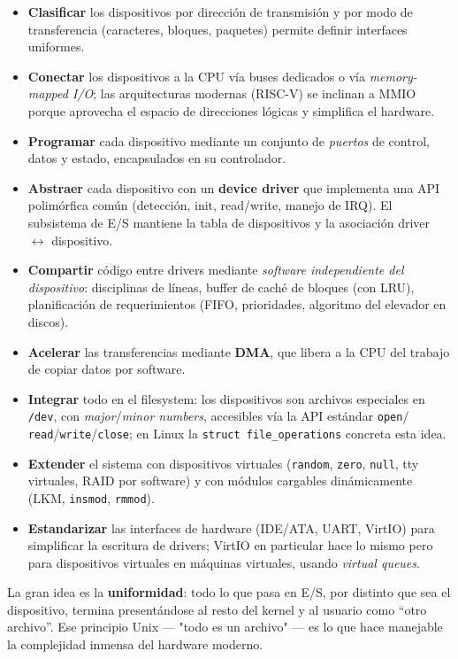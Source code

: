 \documentclass[11pt,a4paper]{article}
\begin{document}
\begin{itemize}[leftmargin=*]
    \item \textbf{Clasificar} los dispositivos por dirección de
        transmisión y por modo de transferencia (caracteres, bloques,
        paquetes) permite definir interfaces uniformes.
    \item \textbf{Conectar} los dispositivos a la CPU vía buses
        dedicados o vía \emph{memory-mapped I/O}; las arquitecturas
        modernas (RISC-V) se inclinan a MMIO porque aprovecha el
        espacio de direcciones lógicas y simplifica el hardware.
    \item \textbf{Programar} cada dispositivo mediante un conjunto de
        \emph{puertos} de control, datos y estado, encapsulados en su
        controlador.
    \item \textbf{Abstraer} cada dispositivo con un \textbf{device
        driver} que implementa una API polimórfica común (detección,
        init, read/write, manejo de IRQ). El subsistema de E/S
        mantiene la tabla de dispositivos y la asociación driver
        $\leftrightarrow$ dispositivo.
    \item \textbf{Compartir} código entre drivers mediante \emph{software
        independiente del dispositivo}: disciplinas de líneas, buffer
        de caché de bloques (con LRU), planificación de requerimientos
        (FIFO, prioridades, algoritmo del elevador en discos).
    \item \textbf{Acelerar} las transferencias mediante \textbf{DMA},
        que libera a la CPU del trabajo de copiar datos por software.
    \item \textbf{Integrar} todo en el filesystem: los dispositivos son
        archivos especiales en \texttt{/dev}, con \emph{major}/\emph{minor
        numbers}, accesibles vía la API estándar \texttt{open}/
        \texttt{read}/\texttt{write}/\texttt{close}; en Linux la
        \texttt{struct file\_operations} concreta esta idea.
    \item \textbf{Extender} el sistema con dispositivos virtuales
        (\texttt{random}, \texttt{zero}, \texttt{null}, tty virtuales,
        RAID por software) y con módulos cargables dinámicamente
        (LKM, \texttt{insmod}, \texttt{rmmod}).
    \item \textbf{Estandarizar} las interfaces de hardware (IDE/ATA,
        UART, VirtIO) para simplificar la escritura de drivers; VirtIO
        en particular hace lo mismo pero para dispositivos virtuales
        en máquinas virtuales, usando \emph{virtual queues}.
\end{itemize}

\begin{idea}
La gran idea es la \textbf{uniformidad}: todo lo que pasa en E/S, por
distinto que sea el dispositivo, termina presentándose al resto del
kernel y al usuario como ``otro archivo''. Ese principio Unix --- "todo
es un archivo" --- es lo que hace manejable la complejidad inmensa del
hardware moderno.
\end{idea}
\end{document}
